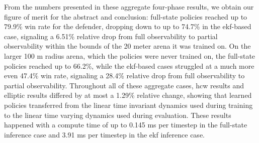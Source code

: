 From the numbers presented in these aggregate four-phase results, we obtain our figure of merit for the abstract and conclusion: full-state policies reached up to 79.9\% win rate for the defender, dropping down to up to 74.7\% in the \acs{ekf}-based case, signaling a 6.51\% relative drop from full observability to partial observability within the bounds of the 20 meter arena it was trained on. On the larger 100 m radius arena, which the policies were never trained on, the full-state policies reached up to 66.2\%, while the \acs{ekf}-based cases struggled at a much more even 47.4\% win rate, signaling a 28.4\% relative drop from full observability to partial observability. Throughout all of these aggregate cases, \acs{hcw} results and elliptic results differed by at most a 1.29\% relative change, showing that learned policies transferred from the linear time invariant dynamics used during training to the linear time varying dynamics used during evaluation. These results happened with a compute time of up to 0.145 ms per timestep in the full-state inference case and 3.91 ms per timestep in the \acs{ekf} inference case.






